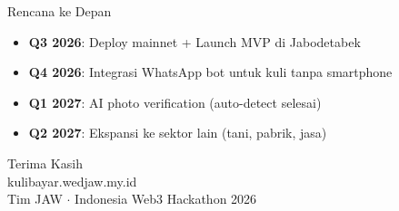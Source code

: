 \documentclass[aspectratio=169,14pt]{beamer}
\newcommand{\highlight}[1]{\textcolor{korange}{\textbf{#1}}}
\begin{document}
\begin{frame}{Rencana ke Depan}
\small
\begin{itemize}
  \item \highlight{Q3 2026}: Deploy mainnet + Launch MVP di Jabodetabek
  \item \highlight{Q4 2026}: Integrasi WhatsApp bot untuk kuli tanpa smartphone
  \item \highlight{Q1 2027}: AI photo verification (auto-detect selesai)
  \item \highlight{Q2 2027}: Ekspansi ke sektor lain (tani, pabrik, jasa)
\end{itemize}

\vspace{0.5em}
\begin{center}
\end{center}
\end{frame}

\begin{frame}[plain]
\vfill
\begin{center}
  {\fontsize{36}{44}\selectfont\textcolor{kwhite}{Terima Kasih}}\\[0.3em]
  {\large\textcolor{korange}{kulibayar.wedjaw.my.id}}\\[1em]
  \textcolor{kmuted}{\small Tim JAW $\cdot$ Indonesia Web3 Hackathon 2026}
\end{center}
\vfill
\end{frame}
\end{document}
